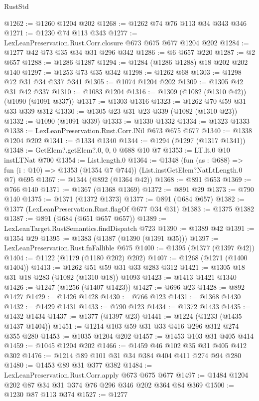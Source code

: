 \begin{lexlean}{RustStd}
\begin{coremodule}
@1262 := @1260 @1204 @202
@1268 := @1262 @74 @76 @113 @34 @343 @346
@1271 := @1230 @74 @113 @343
@1277 := LexLeanPreservation.Rust.Corr.closure @673 @675 @677 @1204 @202
@1284 := @1277 @42 @73 @35 @34 @31 @296 @342
@1286 := @6 @657 @220
@1287 := @2 @657
@1288 := @1286 @1287
@1294 := @1284 (@1286 @1288) @18 @202 @202 @140
@1297 := @1253 @73 @35 @342
@1298 := @1262 @68
@1303 := @1298 @72 @31 @34 @337 @341
@1305 := @1074 @1204 @202
@1309 := @1305 @42 @31 @42 @337
@1310 := @1083 @1204
@1316 := @1309 (@1082 (@1310 @42)) (@1090 (@1091 @337))
@1317 := @1303 @1316
@1323 := @1262 @70 @59 @31 @33 @339 @312
@1330 := @1305 @23 @31 @23 @339 (@1082 (@1310 @23))
@1332 := @1090 (@1091 @339)
@1333 := @1330 @1332
@1334 := @1323 @1333
@1338 := LexLeanPreservation.Rust.Corr.lNil @673 @675 @677
@1340 := @1338 @1204 @202
@1341 := @1334 @1340
@1344 := @1294 (@1297 (@1317 @1341))
@1348 := GetElem?.getElem?.{0, 0, 0} @688 @10 @7
@1353 := LT.lt.{0} @10 instLTNat @700
@1354 := List.length.{0}
@1364 := @1348
    (fun (as : @688) => fun (i : @10) => @1353 (@1354 @7 @744))
    (List.instGetElem?NatLtLength.{0} @7)
    @695
@1367 := @1344 (@892 (@1364 @42))
@1368 := @891 @653
@1369 := @766 @140
@1371 := @1367 (@1368 @1369)
@1372 := @891 @29
@1373 := @790 @140
@1375 := @1371 (@1372 @1373)
@1377 := @891 (@684 @657)
@1382 := @1377 (LexLeanPreservation.Rust.flagOf @677 @34 @31)
@1383 := @1375 @1382
@1387 := @891 (@684 (@651 @657 @657))
@1389 := LexLeanTarget.RustSemantics.findDispatch @723
@1390 := @1389 @42
@1391 := @1354 @29
@1395 := @1383 (@1387 (@1390 (@1391 @35)))
@1397 := LexLeanPreservation.Rust.fnFallible @675
@1400 := @1395 (@1377 (@1397 @42))
@1404 := @1122 (@1179 (@1180 @202) @202)
@1407 := @1268 (@1271 (@1400 @1404))
@1413 := @1262 @51 @59 @31 @33 @283 @312
@1421 := @1305 @18 @31 @18 @283 (@1082 (@1310 @18)) @1093
@1423 := @1413 @1421 @1340
@1426 := @1247 (@1256 (@1407 @1423))
@1427 := @696 @23
@1428 := @892 @1427
@1429 := @1426 @1428
@1430 := @766 @123
@1431 := @1368 @1430
@1432 := @1429 @1431
@1433 := @790 @123
@1434 := @1372 @1433
@1435 := @1432 @1434
@1437 := @1377 (@1397 @23)
@1441 := @1224 (@1233 (@1435 @1437 @1404))
@1451 := @1214 @103 @59 @31 @33 @416 @296 @312 @274 @355 @280
@1453 := @1035 @1204 @202
@1457 := @1453 @103 @31 @405 @414
@1459 := @1045 @1204 @202
@1466 := @1459 @46 @102 @35 @31 @405 @412 @302
@1476 := @1214 @89 @101 @31 @34 @384 @404 @411 @274 @94 @280
@1480 := @1453 @89 @31 @377 @382
@1484 := LexLeanPreservation.Rust.Corr.apply @673 @675 @677
@1497 := @1484 @1204 @202 @87 @34 @31 @374 @76 @296 @346 @202 @364 @84 @369
@1500 := @1230 @87 @113 @374
@1527 := @1277

\end{coremodule}
\end{lexlean}
